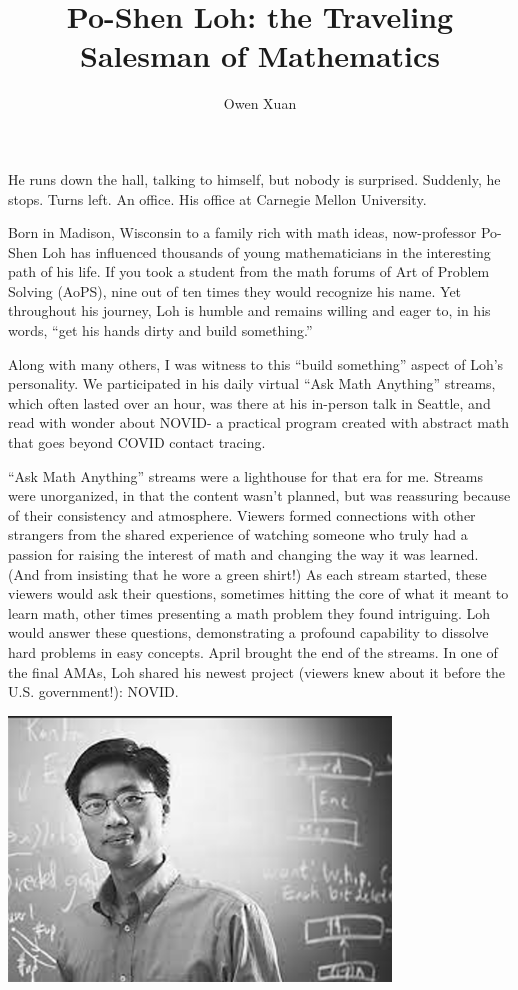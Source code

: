 \documentclass{article}
\title{Po-Shen Loh: the Traveling Salesman of Mathematics}{Owen Xuan}
\author{Owen Xuan}
\begin{document}
He runs down the hall, talking to himself, but nobody is surprised. Suddenly, he stops. Turns left. An office. His office at Carnegie Mellon University.

Born in Madison, Wisconsin to a family rich with math ideas, now-professor Po-Shen Loh has influenced thousands of young mathematicians in the interesting path of his life. If you took a student from the math forums of Art of Problem Solving (AoPS), nine out of ten times they would recognize his name.  Yet throughout his journey, Loh is humble and remains willing and eager to, in his words, “get his hands dirty and build something.”

Along with many others, I was witness to this “build something” aspect of Loh’s personality. We participated in his daily virtual “Ask Math Anything” streams, which often lasted over an hour, was there at his in-person talk in Seattle, and read with wonder about NOVID- a practical program created with abstract math that goes beyond COVID contact tracing.

“Ask Math Anything” streams were a lighthouse for that era for me. Streams were unorganized, in that the content wasn’t planned, but was reassuring because of their consistency and atmosphere. Viewers formed connections with other strangers from the shared experience of watching someone who truly had a passion for raising the interest of math and changing the way it was learned. (And from insisting that he wore a green shirt!) As each stream started, these viewers would ask their questions, sometimes hitting the core of what it meant to learn math, other times presenting a math problem they found intriguing. Loh would answer these questions, demonstrating a profound capability to dissolve hard problems in easy concepts. April brought the end of the streams. In one of the final AMAs, Loh shared his newest project (viewers knew about it before the U.S. government!): NOVID.

\begin{center}
    \includegraphics[width=4in]{images/po-shen loh.png}
\end{center}
\end{document}

